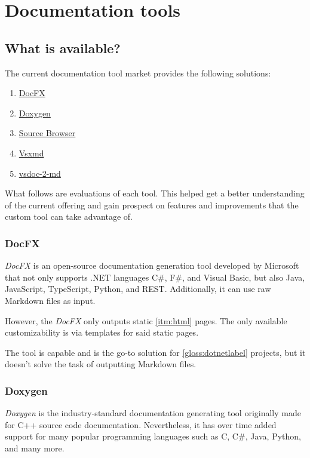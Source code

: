\chapter{Documentation tools}
\section{What is available?}
The current documentation tool market provides the following solutions:

\begin{enumerate}
    \item \href{https://github.com/dotnet/docfx}{DocFX}
    \item \href{https://www.doxygen.nl/}{Doxygen}
    \item \href{https://github.com/KirillOsenkov/SourceBrowser}{Source Browser}
    \item \href{https://github.com/lijunle/Vsxmd}{Vsxmd}
    \item \href{https://github.com/discosultan/vsdoc-2-md}{vsdoc-2-md}
\end{enumerate}

What follows are evaluations of each tool. This helped get a better understanding of the current offering and gain prospect on features and improvements that the custom tool can take advantage of.

\subsection{DocFX}

\textit{DocFX} is an open-source documentation generation tool developed by Microsoft that not only supports .NET languages C\#, F\#, and Visual Basic, but also Java, JavaScript, TypeScript, Python, and REST. Additionally, it can use raw Markdown files as input.

However, the \textit{DocFX} only outputs static \ref{itm:html} pages. The only available customizability is via templates for said static pages.

The tool is capable and is the go-to solution for \ref{gloss:dotnetlabel} projects, but it doesn't solve the task of outputting Markdown files.

\subsection{Doxygen}

\textit{Doxygen} is the industry-standard documentation generating tool originally made for C++ source code documentation. Nevertheless, it has over time added support for many popular programming languages such as C, C\#, Java, Python, and many more.

